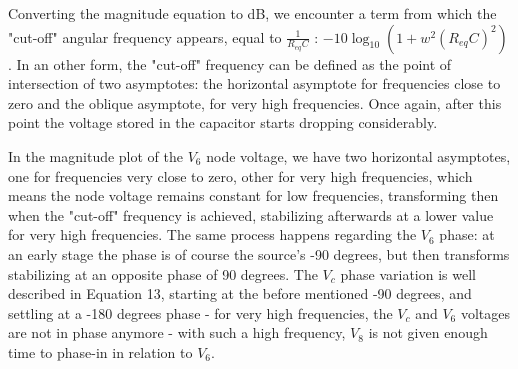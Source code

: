 Converting the magnitude equation to dB, we encounter a term from which the "cut-off" angular frequency appears, equal to $\frac{1}{R_{eq}C}$ : $-10\log_{10}(1+w^2(R_{eq}C)^2)$. In an other form, the "cut-off" frequency can be defined as the point of intersection of two asymptotes: the horizontal asymptote for frequencies close to zero and the oblique asymptote, for very high frequencies. Once again, after this point the voltage stored in the capacitor starts dropping considerably.

In the magnitude plot of the $V_{6}$ node voltage, we have two horizontal asymptotes, one for frequencies very close to zero, other for very high frequencies, which means the node voltage remains constant for low frequencies, transforming then when the "cut-off" frequency is achieved, stabilizing afterwards at a lower value for very high frequencies. The same process happens regarding the $V_{6}$ phase: at an early stage the phase is of course the source's -90 degrees, but then transforms stabilizing at an opposite phase of 90 degrees. The $V_{c}$ phase variation is well described in Equation 13, starting at the before mentioned -90 degrees, and settling at a -180 degrees phase - for very high frequencies, the $V_{c}$ and $V_{6}$ voltages are not in phase anymore - with such a high frequency, $V_{8}$ is not given enough time to phase-in in relation to $V_{6}$.

